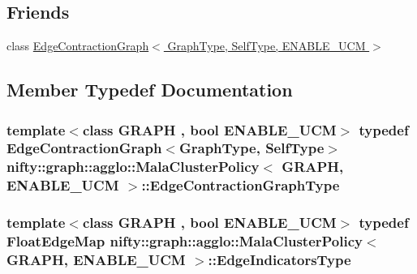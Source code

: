 \subsection*{Friends}
\begin{DoxyCompactItemize}
\item 
class \hyperlink{classnifty_1_1graph_1_1agglo_1_1MalaClusterPolicy_a6939aa4c6113ba9c44fd5e048687ba92}{Edge\+Contraction\+Graph$<$ Graph\+Type, Self\+Type, E\+N\+A\+B\+L\+E\+\_\+\+U\+C\+M $>$}
\end{DoxyCompactItemize}


\subsection{Member Typedef Documentation}
\hypertarget{classnifty_1_1graph_1_1agglo_1_1MalaClusterPolicy_a77a5b41304b53955aafbf214e2ad356f}{}
\subsubsection[{Edge\+Contraction\+Graph\+Type}]{\setlength{\rightskip}{0pt plus 5cm}template$<$class G\+R\+A\+P\+H , bool E\+N\+A\+B\+L\+E\+\_\+\+U\+C\+M$>$ typedef {\bf Edge\+Contraction\+Graph}$<${\bf Graph\+Type}, {\bf Self\+Type}$>$ {\bf nifty\+::graph\+::agglo\+::\+Mala\+Cluster\+Policy}$<$ G\+R\+A\+P\+H, E\+N\+A\+B\+L\+E\+\_\+\+U\+C\+M $>$\+::{\bf Edge\+Contraction\+Graph\+Type}}\label{classnifty_1_1graph_1_1agglo_1_1MalaClusterPolicy_a77a5b41304b53955aafbf214e2ad356f}
\hypertarget{classnifty_1_1graph_1_1agglo_1_1MalaClusterPolicy_acc2c04742b370c093267afd17a14bb0c}{}
\subsubsection[{Edge\+Indicators\+Type}]{\setlength{\rightskip}{0pt plus 5cm}template$<$class G\+R\+A\+P\+H , bool E\+N\+A\+B\+L\+E\+\_\+\+U\+C\+M$>$ typedef Float\+Edge\+Map {\bf nifty\+::graph\+::agglo\+::\+Mala\+Cluster\+Policy}$<$ G\+R\+A\+P\+H, E\+N\+A\+B\+L\+E\+\_\+\+U\+C\+M $>$\+::{\bf Edge\+Indicators\+Type}}\label{classnifty_1_1graph_1_1agglo_1_1MalaClusterPolicy_acc2c04742b370c093267afd17a14bb0c}
\hypertarget{classnifty_1_1graph_1_1agglo_1_1MalaClusterPolicy_a33924545e782bd520270341b21599e7e}{}
